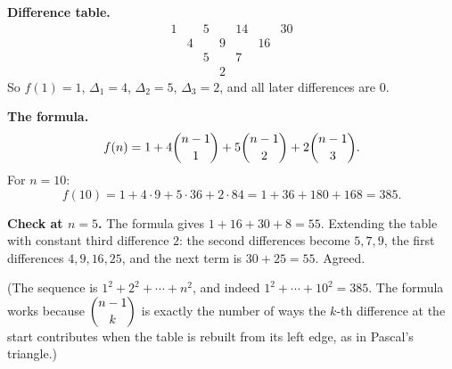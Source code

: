 \textbf{Difference table.}
\[
\begin{array}{ccccccc}
1 && 5 && 14 && 30\\
& 4 && 9 && 16 &\\
&& 5 && 7 &&\\
&&& 2 &&&
\end{array}
\]
So $f(1)=1$, $\Delta_1=4$, $\Delta_2=5$, $\Delta_3=2$, and all later differences are $0$.

\textbf{The formula.}
\[
f(n)=1+4\dbinom{n-1}{1}+5\dbinom{n-1}{2}+2\dbinom{n-1}{3}.
\]
For $n=10$:
\[
f(10)=1+4\cdot9+5\cdot36+2\cdot84=1+36+180+168=\boxed{385}.
\]

\textbf{Check at $n=5$.} The formula gives $1+16+30+8=55$. Extending the table with constant third difference $2$: the second differences become $5,7,9$, the first differences $4,9,16,25$, and the next term is $30+25=55$. Agreed.

(The sequence is $1^2+2^2+\cdots+n^2$, and indeed $1^2+\cdots+10^2=385$. The formula works because $\dbinom{n-1}{k}$ is exactly the number of ways the $k$-th difference at the start contributes when the table is rebuilt from its left edge, as in Pascal's triangle.)
